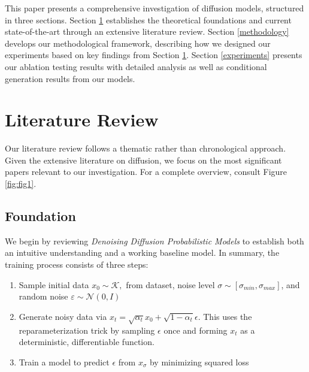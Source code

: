 \documentclass[conference]{IEEEtran}
\begin{document}
This paper presents a comprehensive investigation of diffusion models, structured in three sections. Section \ref{literature review} establishes the theoretical foundations and current state-of-the-art through an extensive literature review. Section \ref{methodology} develops our methodological framework, describing how we designed our experiments based on key findings from Section \ref{literature review}. Section \ref{experiments} presents our ablation testing results with detailed analysis as well as conditional generation results from our models.

\section{Literature Review} \label{literature review}
Our literature review follows a thematic rather than chronological approach. Given the extensive literature on diffusion, we focus on the most significant papers relevant to our investigation. For a complete overview, consult Figure \ref{fig:fig1}.


\subsection{Foundation}\label{foundation}

We begin by reviewing \textit{Denoising Diffusion Probabilistic Models}\cite{hoDenoisingDiffusionProbabilistic2020} to establish both an intuitive understanding and a working baseline model. In summary, the training process consists of three steps:

\begin{enumerate}
    \item Sample initial data $x_0 \sim \mathcal{K},$ from dataset, noise level $\sigma \sim [\sigma_{min} , \sigma_{max}]$, and random noise $\varepsilon \sim \mathcal{N}(0,I)$
    \item Generate noisy data via $x_t = \sqrt{\alpha_t}x_0 + \sqrt{1-\alpha_t}\epsilon$. This uses the reparameterization trick by sampling $\epsilon$ once and forming $x_t$ as a deterministic, differentiable function.
    \item Train a model to predict $\epsilon$ from $x_\sigma$ by minimizing squared loss
\end{enumerate}
\end{document}
